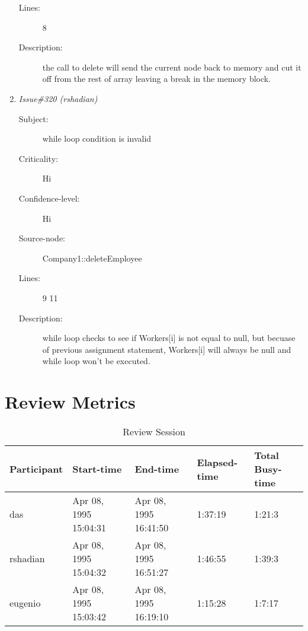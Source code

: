 \begin{enumerate}
\begin{description}
\item [Lines:] 8

\item [Description:] the call to delete will send the current node
back to memory and cut it off from the rest of array leaving a break in the
memory block.
\end{description}
\item {\it Issue\#320 (rshadian)}
\begin{description}
\item [Subject:] while loop condition is invalid
\item [Criticality:] Hi
\item [Confidence-level:] Hi
\item [Source-node:] Company1::deleteEmployee

\item [Lines:] 9 11

\item [Description:] while loop checks to see if Workers[i] is not
equal to null, but becuase of previous assignment statement, Workers[i] will
always be null and while loop won't be executed.
\end{description}
\end{enumerate}
\section{Review Metrics}
\begin{table}[hb]
\begin{center}
\begin{tabular}{|l|l|l|l|l|}
\hline
Participant & Start-time & End-time & Elapsed-time & Total Busy-time \\
\hline
das & Apr 08, 1995 15:04:31 & Apr 08, 1995 16:41:50 & 1:37:19 & 1:21:3 \\
rshadian & Apr 08, 1995 15:04:32 & Apr 08, 1995 16:51:27 & 1:46:55 & 1:39:3 \\
eugenio & Apr 08, 1995 15:03:42 & Apr 08, 1995 16:19:10 & 1:15:28 & 1:7:17 \\
\hline
\end{tabular}
\end{center}
\caption{Review Session}
\end{table}


